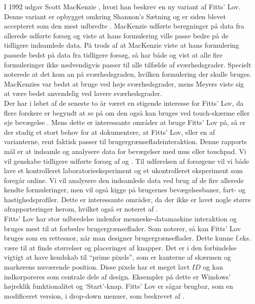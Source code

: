 I 1992 udgav Scott MacKenzie \cite{mackenzie1992}, hvori han beskrev en ny variant af Fitts' Lov. Denne variant er opbygget omkring Shannon's Sætning \cite{goldberg2015} og er siden blevet accepteret som den mest udbredte \cite{guiard2011}. MacKenzie udførte beregninger på data fra allerede udførte forsøg og viste at hans formulering ville passe bedre på de tidligere indsamlede data. På trods af at MacKenzie viste at hans formulering passede bedst på data fra tidligere forsøg, så har både \cite{drewes2010} og \cite{goldberg2015} vist at alle fire formuleringer ikke nødvendigvis passer til alle tilfælde af sværhedsgrader. Specielt noterede \cite{goldberg2015} at det kom an på sværhedsgraden, hvilken formulering der skulle bruges. MacKenzies var bedst at bruge ved høje sværhedsgrader, mens Meyers viste sig at være bedst anvendelig ved lavere sværhedsgrader.\\

Der har i løbet af de seneste to år været en stigende interesse for Fitts' Lov, da flere forskere er begyndt at se på om den også kan bruges ved touch-skærme eller øje bevægelse \cite{hong2015} \cite{zhao2015} \cite{jiang2014} \cite{greene2014}. Mens dette er interessante områder at bruge Fitts' Lov på, så er der stadig et stort behov for at dokumentere, at Fitts' Lov, eller en af varianterne, rent faktisk passer til brugergrænsefladeinteraktion. Denne rapports mål er at indsamle og analysere data for bevægelser med mus eller touchpad. Vi vil genskabe tidligere udførte forsøg af \cite{accot1997} og \cite{goldberg2015}. Til udførelsen af forsøgene vil vi både lave et kontrolleret laboratorieeksperiment og et ukontrolleret eksperiment som foregår online. Vi vil analysere den indsamlede data ved brug af de fire allerede kendte formuleringer, men vil også kigge på brugernes bevægelsesbaner, fart- og hastighedsprofiler. Dette er interessante områder, da der ikke er lavet nogle større afrapporteringer herom, hvilket også er noteret af \cite{goldberg2015}.\\

Fitts' Lov har stor udbredelse indenfor menneske-datamaskine interaktion og bruges mest til at forbedre brugergrænseflader. Som \cite{karafillis2012} noterer, så kan Fitts' Lov bruges som en rettesnor, når man designer brugergrænseflader. Dette kunne f.eks. være til at finde størrelser og placeringer af knapper. Det er i den forbindelse vigtigt at have kendskab til ``prime pixels'', som er kanterne af skærmen og markørens nuværende position. Disse pixels har et meget lavt $ID$ og kan indkorporeres som centrale dele af design. Eksempler på dette er Windows' højreklik funktionalitet og `Start'-knap. Fitts' Lov er sågar brugbar, som en modificeret version, i drop-down menuer, som beskrevet af \cite{accot1997}.

